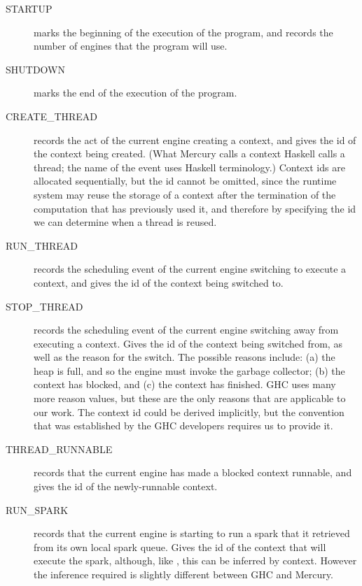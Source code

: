 \begin{description}

\item[STARTUP]
marks the beginning of the execution of the program,
and records the number of engines that the program will use.

\item[SHUTDOWN]
marks the end of the execution of the program.

\item[CREATE\_THREAD]
records the act of the current engine creating a context,
and gives the id of the context being created.
(What Mercury calls a context Haskell calls a thread;
the name of the event uses Haskell terminology.)
Context ids are allocated sequentially,
but the id cannot be omitted,
since the runtime system may reuse the storage of a context
after the termination of the computation that has previously used it,
and therefore by specifying the id we can determine when a thread is reused.

\item[RUN\_THREAD]
records the scheduling event
of the current engine switching to execute a context,
and gives the id of the context being switched to.

\item[STOP\_THREAD]
records the scheduling event
of the current engine switching away from executing a context.
Gives the id of the context being switched from,
as well as the reason for the switch.
The possible reasons include:
(a) the heap is full, and so the engine must invoke the garbage collector;
(b) the context has blocked, and
(c) the context has finished.
GHC uses many more reason values, but these are the only reasons that
are applicable to our work.
The context id could be derived implicitly,
but the convention that was established by the GHC developers requires us to
provide it.

\item[THREAD\_RUNNABLE]
records that the current engine has made a blocked context runnable,
and gives the id of the newly-runnable context.

\item[RUN\_SPARK]
records that the current engine is starting to run a spark
that it retrieved from its own local spark queue.
Gives the id of the context that will execute the spark,
although, like , this can be inferred by context.
However the inference required is slightly different between GHC and Mercury.


\end{description}
